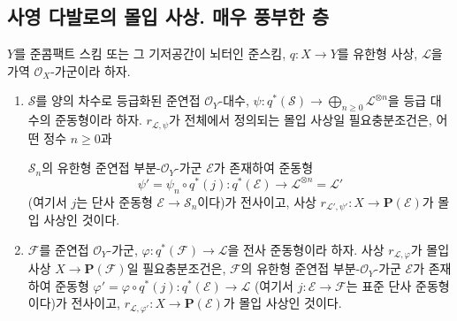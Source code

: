 \subsection{사영 다발로의 몰입 사상. 매우 풍부한 층}
\label{subsection:II.4.4-ko}

\begin{proposition}[4.4.1]
\label{II.4.4.1-ko}
$Y$를 준콤팩트 스킴 또는 그 기저공간이 뇌터인 준스킴,
$q:X\to Y$를 유한형 사상, $\mathcal{L}$을 가역
$\mathcal{O}_X$-가군이라 하자.
\begin{enumerate}
  \item[\rm{(i)}] $\mathcal{S}$를 양의 차수로 등급화된 준연접
  $\mathcal{O}_Y$-대수,
  $\psi:q^*(\mathcal{S})\to\bigoplus_{n\geq0}\mathcal{L}^{\otimes n}$을
  등급 대수의 준동형이라 하자. $r_{\mathcal{L},\psi}$가 전체에서
  정의되는 몰입 사상일 필요충분조건은, 어떤 정수 $n\geq0$과


  $\mathcal{S}_n$의 유한형 준연접 부분-$\mathcal{O}_Y$-가군
  $\mathcal{E}$가 존재하여 준동형
  \[
    \psi'=\psi_n\circ q^*(j):q^*(\mathcal{E})
      \longrightarrow\mathcal{L}^{\otimes n}=\mathcal{L}'
  \]
  (여기서 $j$는 단사 준동형 $\mathcal{E}\to\mathcal{S}_n$이다)가
  전사이고, 사상
  $r_{\mathcal{L}',\psi'}:X\to\mathbf{P}(\mathcal{E})$가 몰입
  사상인 것이다.
  \item[\rm{(ii)}] $\mathcal{F}$를 준연접 $\mathcal{O}_Y$-가군,
  $\varphi:q^*(\mathcal{F})\to\mathcal{L}$을 전사 준동형이라 하자.
  사상 $r_{\mathcal{L},\varphi}$가 몰입 사상
  $X\to\mathbf{P}(\mathcal{F})$일 필요충분조건은,
  $\mathcal{F}$의 유한형 준연접 부분-$\mathcal{O}_Y$-가군
  $\mathcal{E}$가 존재하여 준동형
  $\varphi'=\varphi\circ q^*(j):q^*(\mathcal{E})\to\mathcal{L}$
  (여기서 $j:\mathcal{E}\to\mathcal{F}$는 표준 단사 준동형이다)가
  전사이고, $r_{\mathcal{L},\varphi'}:X\to\mathbf{P}(\mathcal{E})$가
  몰입 사상인 것이다.
\end{enumerate}
\end{proposition}

